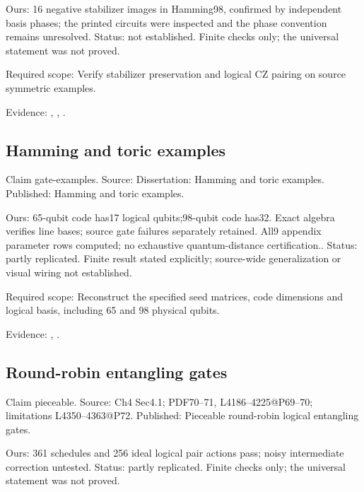 Ours: 16 negative stabilizer images in Hamming98, confirmed by independent basis phases; the printed circuits were inspected and the phase convention remains unresolved. Status: not established. Finite checks only; the universal statement was not proved.

Required scope: Verify stabilizer preservation and logical CZ pairing on source symmetric examples.

Evidence: \href{https://github.com/alectionary/vibe-math/blob/master/formalization/quintavalle-hgp/sources/browser-extraction.txt}{}, \href{https://github.com/alectionary/vibe-math/blob/master/formalization/quintavalle-hgp/availability.md}{}, \href{https://github.com/alectionary/vibe-math/blob/master/formalization/quintavalle-hgp/results/independent_checks.json}{}.
\subsection{Hamming and toric examples}\label{claim:gate-examples}
Claim gate-examples. Source: Dissertation: Hamming and toric examples. Published: Hamming and toric examples.

Ours: 65-qubit code has17 logical qubits;98-qubit code has32. Exact algebra verifies line bases; source gate failures separately retained. All9 appendix parameter rows computed; no exhaustive quantum-distance certification.. Status: partly replicated. Finite result stated explicitly; source-wide generalization or visual wiring not established.

Required scope: Reconstruct the specified seed matrices, code dimensions and logical basis, including 65 and 98 physical qubits.

Evidence: \href{https://github.com/alectionary/vibe-math/blob/master/formalization/quintavalle-hgp/sources/browser-extraction.txt}{}, \href{https://github.com/alectionary/vibe-math/blob/master/formalization/quintavalle-hgp/availability.md}{}.
\subsection{Round-robin entangling gates}\label{claim:pieceable}
Claim pieceable. Source: Ch4 Sec4.1; PDF70--71, L4186--4225@P69--70; limitations L4350--4363@P72. Published: Pieceable round-robin logical entangling gates.

Ours: 361 schedules and 256 ideal logical pair actions pass; noisy intermediate correction untested. Status: partly replicated. Finite checks only; the universal statement was not proved.

